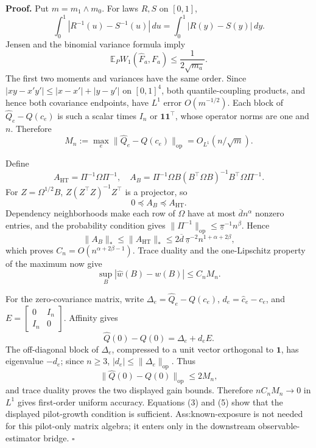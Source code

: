 \textbf{Proof.}
Put \(m=m_1\wedge m_0\).  For laws \(R,S\) on \([0,1]\),
\[
\int_0^1|R^{-1}(u)-S^{-1}(u)|\,du
=\int_0^1|R(y)-S(y)|\,dy.
\tag{1}
\]
Jensen and the binomial variance formula imply
\[
\mathbb E_PW_1(\widehat F_a,F_a)
\le\frac{1}{2\sqrt{m_a}}.
\tag{2}
\]
The first two moments and variances have the same order.  Since \(|xy-x'y'|\le|x-x'|+|y-y'|\) on \([0,1]^4\), both quantile-coupling products, and hence both covariance endpoints, have \(L^1\) error \(O(m^{-1/2})\).  Each block of \(\widehat Q_e-Q(c_e)\) is such a scalar times \(I_n\) or \(\mathbf1\mathbf1^\top\), whose operator norms are one and \(n\).  Therefore
\[
M_n:=\max_e\lVert\widehat Q_e-Q(c_e)\rVert_{\mathrm{op}}
=O_{L^1}(n/\sqrt m).
\tag{3}
\]

Define
\[
A_{\mathrm{HT}}=\Pi^{-1}\Omega\Pi^{-1},
\quad
A_B=\Pi^{-1}\Omega B(B^\top\Omega B)^{-1}B^\top\Omega\Pi^{-1}.
\]
For \(Z=\Omega^{1/2}B\), \(Z(Z^\top Z)^{-1}Z^\top\) is a projector, so
\[
0\preceq A_B\preceq A_{\mathrm{HT}}.
\tag{4}
\]
Dependency neighborhoods make each row of \(\Omega\) have at most \(\overline d n^\alpha\) nonzero entries, and the probability condition gives \(\lVert\Pi^{-1}\rVert_{\mathrm{op}}\le\underline\pi^{-1}n^\beta\).  Hence
\[
\lVert A_B\rVert_*\le\lVert A_{\mathrm{HT}}\rVert_*
\le2\overline d\,\underline\pi^{-2}n^{1+\alpha+2\beta},
\tag{5}
\]
which proves \(C_n=O(n^{\alpha+2\beta-1})\).  Trace duality and the one-Lipschitz property of the maximum now give
\[
\sup_B|\widehat w(B)-w(B)|\le C_nM_n.
\tag{6}
\]

For the zero-covariance matrix, write \(\Delta_e=\widehat Q_e-Q(c_e)\), \(d_e=\widehat c_e-c_e\), and \(E=\begin{bmatrix}0&I_n\\I_n&0\end{bmatrix}\).  Affinity gives
\[
\widehat Q(0)-Q(0)=\Delta_e+d_eE.
\tag{7}
\]
The off-diagonal block of \(\Delta_e\), compressed to a unit vector orthogonal to \(\mathbf1\), has eigenvalue \(-d_e\); since \(n\ge3\), \(|d_e|\le\lVert\Delta_e\rVert_{\mathrm{op}}\).  Thus
\[
\lVert\widehat Q(0)-Q(0)\rVert_{\mathrm{op}}\le2M_n,
\]
and trace duality proves the two displayed gain bounds.  Therefore \(nC_nM_n\to0\) in \(L^1\) gives first-order uniform accuracy.  Equations (3) and (5) show that the displayed pilot-growth condition is sufficient.  Ass:known-exposure is not needed for this pilot-only matrix algebra; it enters only in the downstream observable-estimator bridge. \(\square\)